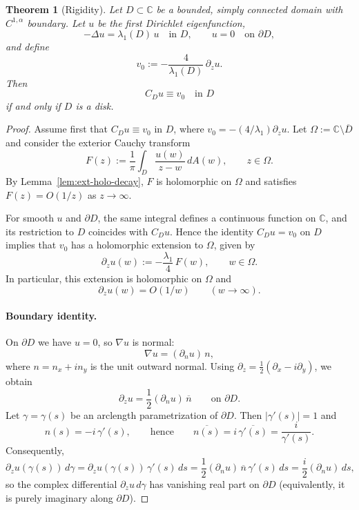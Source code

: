 \documentclass[10pt,a4paper]{amsart}
\newtheorem{theorem}{Theorem}
\newcommand{\C}{\mathbb{C}}
\begin{document}
\begin{theorem}[Rigidity]\label{thm:rigidity-disk}
Let $D \subset \C$ be a bounded, simply connected domain with $C^{1,\alpha}$ boundary.
Let $u$ be the first Dirichlet eigenfunction,
\[
-\Delta u=\lambda_1(D)\,u \quad \text{in } D, \qquad u=0 \quad \text{on } \partial D,
\]
and define
\[
v_0 := -\frac{4}{\lambda_1(D)}\,\partial_z u .
\]
Then
\[
C_D u \equiv v_0 \quad \text{in } D
\]
if and only if $D$ is a disk.
\end{theorem}

\begin{proof}
Assume first that $C_Du\equiv v_0$ in $D$, where $v_0=-(4/\lambda_1)\partial_z u$.
Let $\Omega:=\C\setminus\overline D$ and consider the exterior Cauchy transform
\[
F(z):=\frac{1}{\pi}\int_D \frac{u(w)}{z-w}\,dA(w),\qquad z\in\Omega.
\]
By Lemma~\ref{lem:ext-holo-decay}, $F$ is holomorphic on $\Omega$ and satisfies $F(z)=O(1/z)$ as $z\to\infty$.

For smooth $u$ and $\partial D$, the same integral defines a continuous function on $\C$, and its restriction
to $D$ coincides with $C_Du$. Hence the identity $C_Du=v_0$ on $D$ implies that $v_0$ has a holomorphic
extension to $\Omega$, given by
\[
\partial_z u(w) := -\frac{\lambda_1}{4}\,F(w),\qquad w\in\Omega.
\]
In particular, this extension is holomorphic on $\Omega$ and
\begin{equation}\label{eq:dz-decay}
\partial_z u(w)=O(1/w)\qquad (w\to\infty).
\end{equation}

\paragraph{Boundary identity.}
On $\partial D$ we have $u=0$, so $\nabla u$ is normal:
\[
\nabla u = (\partial_n u)\,n,
\]
where $n=n_x+i n_y$ is the unit outward normal. Using $\partial_z=\tfrac12(\partial_x-i\partial_y)$, we obtain
\[
\partial_z u
=\frac12(\partial_n u)\,\overline{n}
\qquad \text{on }\partial D.
\]
Let $\gamma=\gamma(s)$ be an arclength parametrization of $\partial D$. Then $|\gamma'(s)|=1$ and
\[
n(s)=-i\,\gamma'(s),
\qquad\text{hence}\qquad
\overline{n(s)}=i\,\overline{\gamma'(s)}=\frac{i}{\gamma'(s)}.
\]
Consequently,
\[
\partial_z u(\gamma(s))\,d\gamma
=\partial_z u(\gamma(s))\,\gamma'(s)\,ds
=\frac12(\partial_n u)\,\overline{n}\,\gamma'(s)\,ds
=\frac{i}{2}(\partial_n u)\,ds,
\]
so the complex differential $\partial_z u\,d\gamma$ has vanishing real part on $\partial D$
(equivalently, it is purely imaginary along $\partial D$).


\end{proof}
\end{document}
